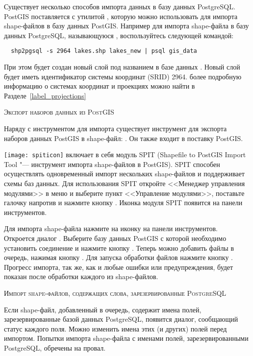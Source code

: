 Существует несколько способов импорта данных в базу данных PostgreSQL. PostGIS
поставляется с утилитой , которую можно использовать для
импорта shape-файлов в базу данных PostGIS. Например для импорта shape-файла
 в базу данных PostgreSQL, называющуюся
, воспользуйтесь следующей командой:

\begin{verbatim}
  shp2pgsql -s 2964 lakes.shp lakes_new | psql gis_data
\end{verbatim}

При этом будет создан новый слой под названием  в
базе данных . Новый слой будет иметь идентификатор
системы координат (SRID) 2964. более подробную информацию о системах координат
и проекциях можно найти в Разделе~\ref{label_projections}
\begin{Tip}
\caption{\textsc{Экспорт наборов данных из PostGIS}}
Наряду с инструментом для импорта  существует инструмент
для экспорта наборов данных PostGIS в shape-файл: .
Он также входит в поставку PostGIS.
\end{Tip}

\texttt{[image: spiticon]} \qg включает в себя модуль
SPIT (Shapefile to PostGIS Import Tool "--- инструмент импорта shape-файлов
в PostGIS). SPIT способен осуществлять одновременный
импорт нескольких shape-файлов и поддерживает схемы баз данных. Для
использования SPIT откройте <<Менеджер управления модулями>> \qg в меню
 и выберите пункт <<Управление модулями>>, поставьте
галочку напротив  и нажмите кнопку . Иконка
модуля SPIT появится на панели инструментов.

Для импорта shape-файла нажмите на иконку 
на панели инструментов. \\
Откроется диалог .
Выберите базу данных PostGIS с которой необходимо установить соединение и
нажмите кнопку . Теперь можно добавить файлы в
очередь, нажимая кнопку . Для запуска обработки файлов
нажмите кнопку . Прогресс импорта, так же, как и любые ошибки
или предупреждения, будет показан после обработки каждого из shape-файлов.

\begin{Tip}\caption{\textsc{Импорт shape-файлов, содержащих
слова, зарезервированные PostgreSQL}}
Если shape-файл, добавленный в очередь, содержит имена полей, зарезервированные
базой данных PostgreSQL, появится диалог, сообщающий статус каждого поля.
Можно изменить имена этих (и других) полей
перед импортом. Попытки импорта shape-файла с именами полей, зарезервированными
PostgreSQL, обречены на провал.
\end{Tip}

